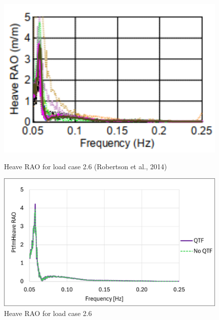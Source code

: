 \documentclass[a4paper, 11pt]{article}
\begin{document}
\begin{figure}[H]
    \begin{minipage}{0.48\textwidth}
        \centering
        \includegraphics[width=1\textwidth]{2.6_heave.png}
        \caption{\small Heave RAO for load case 2.6 (Robertson et al., 2014)}
        \label{fig:2.6_heave}
    \end{minipage}
    \hfill
    \begin{minipage}{0.5\textwidth}
        \centering
        \includegraphics[width=1\textwidth]{2.6_heave_mine.png}
        \caption{\small Heave RAO for load case 2.6} 
        \label{fig:2.6_heave_mine}
    \end{minipage}
\end{figure}
\end{document}

